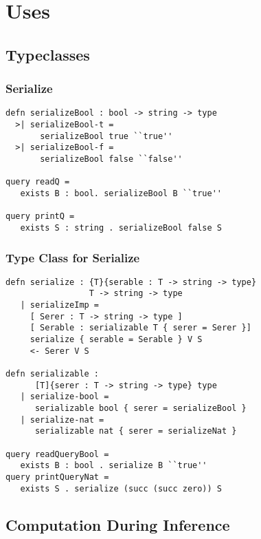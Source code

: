 \section{Uses}
\subsection{Typeclasses}

\begin{frame}[fragile]
\frametitle{Serialize}

\begin{lstlisting}
defn serializeBool : bool -> string -> type
  >| serializeBool-t = 
       serializeBool true ``true''
  >| serializeBool-f = 
       serializeBool false ``false''

query readQ = 
   exists B : bool. serializeBool B ``true''

query printQ = 
   exists S : string . serializeBool false S
\end{lstlisting}

\end{frame}

\begin{frame}[fragile]
\frametitle{Type Class for Serialize}

\begin{lstlisting}
defn serialize : {T}{serable : T -> string -> type} 
                 T -> string -> type
   | serializeImp = 
     [ Serer : T -> string -> type ]
     [ Serable : serializable T { serer = Serer }]
     serialize { serable = Serable } V S
     <- Serer V S

defn serializable : 
      [T]{serer : T -> string -> type} type
   | serialize-bool = 
      serializable bool { serer = serializeBool }
   | serialize-nat = 
      serializable nat { serer = serializeNat }

query readQueryBool = 
   exists B : bool . serialize B ``true''
query printQueryNat = 
   exists S . serialize (succ (succ zero)) S
\end{lstlisting}

\end{frame}


\subsection[Linearity]{Computation During Inference}

